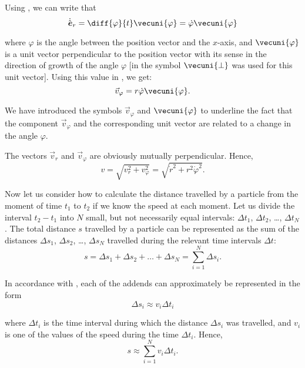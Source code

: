 Using , we can write that
\begin{equation*}
\dot{\hat{\boldsymbol{e}}}_r = \diff{\varphi}{t}\vecuni{\varphi} = \dot{\varphi}\vecuni{\varphi}
\end{equation*}

\noindent
where $\varphi$ is the angle between the position vector and the $x$-axis, and $\vecuni{\varphi}$ is a unit vector perpendicular to the position vector with its sense in the direction of growth of the angle $\varphi$ [in  the symbol $\vecuni{\perp}$ was used for this unit vector]. Using this value in , we get:
\begin{equation}\label{eq:1_71}
\vec{v}_{\varphi} = r\dot{\varphi}\vecuni{\varphi}.
\end{equation}

\noindent
We have introduced the symbols $\vec{v}_{\varphi}$ and $\vecuni{\varphi}$ to underline the fact that the component $\vec{v}_{\varphi}$ and the corresponding unit vector are related to a change in the angle $\varphi$.

The vectors $\vec{v}_r$ and $\vec{v}_{\varphi}$ are obviously mutually perpendicular. Hence,
\begin{equation}\label{eq:1_72}
v = \sqrt{v_r^2 + v_{\varphi}^2} = \sqrt{\dot{r}^2 + r^2\dot{\varphi}^2}.
\end{equation}

Now let us consider how to calculate the distance travelled by a particle from the moment of time $t_1$ to $t_2$ if we know the speed at each moment. Let us divide the interval $t_2-t_1$ into $N$ small, but not necessarily equal intervals: $\Delta t_1$, $\Delta t_2$, \ldots, $\Delta t_N$. The total distance $s$ travelled by a particle can be represented as the sum of the distances $\Delta s_1$, $\Delta s_2$, \ldots, $\Delta s_N$ travelled during the relevant time intervals $\Delta t$:
\begin{equation*}
s = \Delta s_1 + \Delta s_2 + \ldots + \Delta s_N = \sum_{i=1}^{N} \Delta s_i.
\end{equation*}

\noindent
In accordance with , each of the addends can approximately be represented in the form
\begin{equation*}
\Delta s_i \approx v_i \Delta t_i
\end{equation*}

\noindent
where $\Delta t_i$ is the time interval during which the distance $\Delta s_i$ was travelled, and $v_i$ is one of the values of the speed during the time $\Delta t_i$. Hence,
\begin{equation}\label{eq:1_73}
s \approx \sum_{i=1}^{N} v_i \Delta t_i.
\end{equation}

